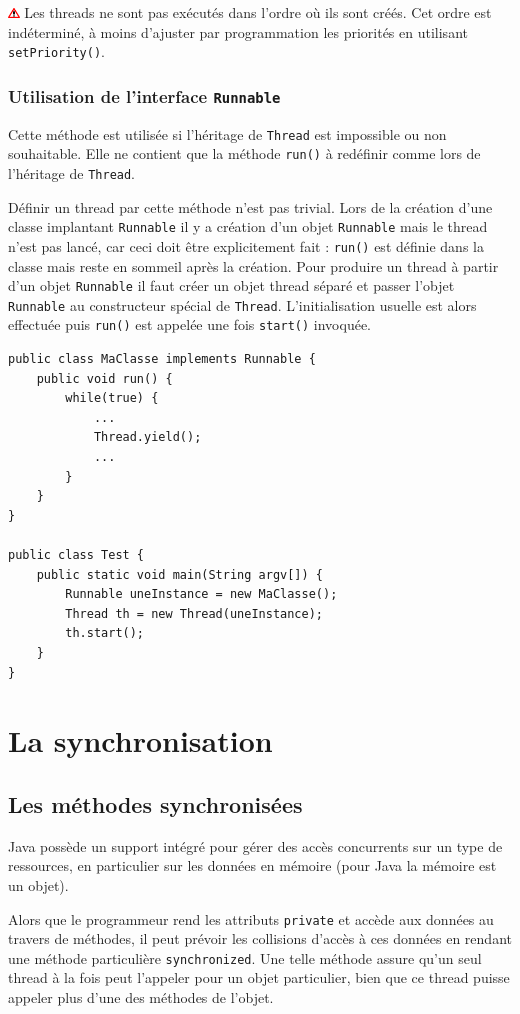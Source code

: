 \documentclass[a4paper,11pt]{report}
\newcommand{\attention}[1]{
	\begin{center}
	\medskip
	\colorbox{attention}{
		\begin{minipage}{0.8\textwidth}\medskip\includegraphics[height=10px]{images/attention.png} #1 \medskip\end{minipage}
	}
	\medskip
	\end{center}
}
\begin{document}
\attention{Les threads ne sont pas exécutés dans l\rq{}ordre où ils sont créés. Cet ordre est indéterminé, à moins d\rq{}ajuster par programmation les priorités en utilisant \texttt{setPriority()}.}

\subsubsection{Utilisation de l\rq{}interface \texttt{Runnable}}
Cette méthode est utilisée si l\rq{}héritage de \texttt{Thread} est impossible ou non souhaitable. Elle ne contient que la méthode \texttt{run()} à redéfinir comme lors de l\rq{}héritage de \texttt{Thread}.

Définir un thread par cette méthode n\rq{}est pas trivial. Lors de la création d\rq{}une classe implantant \texttt{Runnable} il y a création d\rq{}un objet \texttt{Runnable} mais le thread n\rq{}est pas lancé, car ceci doit être explicitement fait : \texttt{run()} est définie dans la classe mais reste en sommeil après la création. Pour produire un thread à partir d\rq{}un objet \texttt{Runnable} il faut créer un objet thread séparé et passer l\rq{}objet \texttt{Runnable} au constructeur spécial de \texttt{Thread}. L\rq{}initialisation usuelle est alors effectuée puis \texttt{run()} est appelée une fois \texttt{start()} invoquée.

\begin{lstlisting}
public class MaClasse implements Runnable {
	public void run() {
		while(true) {
			...
			Thread.yield();
			...
		}
	}
}

public class Test {
	public static void main(String argv[]) {
		Runnable uneInstance = new MaClasse();
		Thread th = new Thread(uneInstance);
		th.start();
	}
}

\end{lstlisting}

\section{La synchronisation}
\subsection{Les méthodes synchronisées}

Java possède un support intégré pour gérer des accès concurrents sur un type de ressources, en particulier sur les données en mémoire (pour Java la mémoire est un objet).

Alors que le programmeur rend les attributs \texttt{private} et accède aux données au travers de méthodes, il peut prévoir les collisions d\rq{}accès à ces données en rendant une méthode particulière \texttt{synchronized}. Une telle méthode assure qu\rq{}un seul thread à la fois peut l\rq{}appeler pour un objet particulier, bien que ce thread puisse appeler plus d\rq{}une des méthodes de l\rq{}objet.
\end{document}
